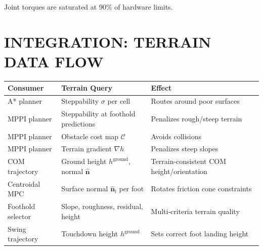 \documentclass[11pt,a4paper]{article}
\begin{document}
Joint torques are saturated at 90\% of hardware limits.

\section{INTEGRATION: TERRAIN DATA FLOW}

\begin{center}
\begin{tabular}{|l|l|l|}
\hline
\textbf{Consumer} & \textbf{Terrain Query} & \textbf{Effect} \\
\hline
A* planner & Steppability $\sigma$ per cell & Routes around poor surfaces \\
MPPI planner & Steppability at foothold predictions & Penalizes rough/steep terrain \\
MPPI planner & Obstacle cost map $\mathcal{C}$ & Avoids collisions \\
MPPI planner & Terrain gradient $\nabla h$ & Penalizes steep slopes \\
COM trajectory & Ground height $h^{\text{ground}}$, normal $\hat{\mathbf{n}}$ & Terrain-consistent COM height/orientation \\
Centroidal MPC & Surface normal $\hat{\mathbf{n}}_l$ per foot & Rotates friction cone constraints \\
Foothold selector & Slope, roughness, residual, height & Multi-criteria terrain quality \\
Swing trajectory & Touchdown height $h^{\text{ground}}$ & Sets correct foot landing height \\
\hline
\end{tabular}
\end{center}
\end{document}
